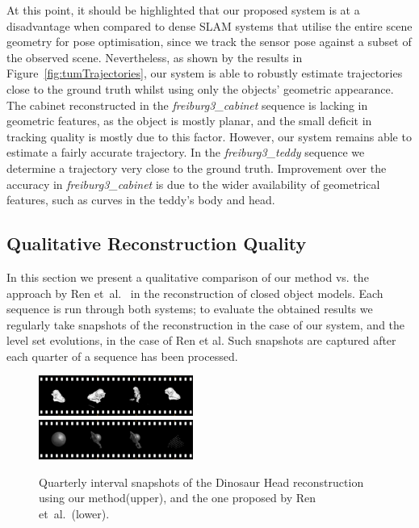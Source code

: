 At this point, it should be highlighted that our proposed system is at a disadvantage when compared to dense SLAM systems that utilise the entire scene geometry for pose optimisation, since we track the sensor pose against a subset of the observed scene.
Nevertheless, as shown by the results in Figure~\ref{fig:tumTrajectories}, our system is able to robustly estimate trajectories close to the ground truth whilst using only the objects' geometric appearance.
The cabinet reconstructed in the \textit{freiburg3\_cabinet} sequence is lacking in geometric features, as the object is mostly planar,
and the small deficit in tracking quality is mostly due to this factor.
However, our system remains able to estimate a fairly accurate trajectory. 
In the \textit{freiburg3\_teddy} sequence we determine a trajectory very close to the ground truth.
Improvement over the accuracy in \textit{freiburg3\_cabinet} is due to the wider availability of geometrical features, such as curves in the teddy's body and head.

\subsection{Qualitative Reconstruction Quality}
In this section we present a qualitative comparison of our method vs. the approach by Ren et~al.~\cite{Ren2013} in the reconstruction of closed object models. %
Each sequence is run through both systems; to evaluate the obtained results we regularly take snapshots of the reconstruction in the case of our system, and the level set evolutions, in the case of Ren et al.
Such snapshots are captured after each quarter of a sequence has been processed. %

\begin{figure}[!t]
	\centering
		\includegraphics[width=0.45\textwidth]{filmstrips/dino.png} \\
		\vspace{0.5mm}
		\includegraphics[width=0.45\textwidth]{filmstrips/dino_s3d_large.png}
	\caption{
        Quarterly interval snapshots of the Dinosaur Head reconstruction using our method(upper), and the one proposed by Ren et~al.~\cite{Ren2013}(lower).
	}
	\label{fig:dinoComparison}
\end{figure}

